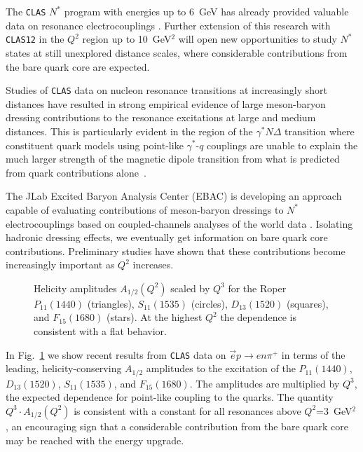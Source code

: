 The {\tt CLAS} $N^*$ program with energies up to 6~GeV has already 
provided valuable data on resonance electrocouplings
\cite{Bur1,Bu05}.  Further extension of this research with 
{\tt CLAS12} in the $Q^2$ region up to 10~GeV$^2$ will open new 
opportunities to study $N^*$ states at still unexplored distance scales, 
where considerable contributions from the bare quark core are expected.

Studies of {\tt CLAS} data on nucleon resonance transitions at increasingly 
short distances have resulted in strong empirical evidence of large 
meson-baryon dressing contributions to the resonance excitations at large 
and medium distances. This is particularly evident in the region of the 
$\gamma^*N\Delta$ transition where constituent quark models using point-like 
$\gamma^*$-$q$ couplings are unable to explain the much larger strength of 
the magnetic dipole transition from what is predicted from quark 
contributions alone~\cite{Bur1}.

The JLab Excited Baryon Analysis Center (EBAC) is developing an approach
capable of evaluating contributions of meson-baryon dressings to $N^*$ 
electrocouplings based on coupled-channels analyses of the world data 
\cite{Lee06}.  Isolating hadronic dressing effects, we eventually get 
information on bare quark core contributions.  Preliminary studies have 
shown that these contributions become increasingly important as $Q^2$ 
increases.
    
\begin{figure}[ht]
\vspace{5.3cm}
\caption{\small{Helicity amplitudes $A_{1/2}(Q^2)$ scaled by $Q^3$ for the 
Roper $P_{11}(1440)$ (triangles), $S_{11}(1535)$ (circles), $D_{13}(1520)$ 
(squares), and $F_{15}(1680)$ (stars). At the highest $Q^2$ the dependence is 
consistent with a flat behavior.}}
\label{fig:asym_1}
\end{figure}

In Fig.~\ref{fig:asym_1} we show recent results from {\tt CLAS} data on 
$\vec{e} p \rightarrow en\pi^+$ in terms of the leading, helicity-conserving 
$A_{1/2}$ amplitudes to the excitation of the $P_{11}(1440)$, $D_{13}(1520)$, 
$S_{11}(1535)$, and $F_{15}(1680)$.  The amplitudes are multiplied by $Q^3$, 
the expected dependence for point-like coupling to the quarks.  The quantity 
$Q^3 \cdot A_{1/2}(Q^2)$ is consistent with a constant for all resonances 
above $Q^2$=3~GeV$^2$, an encouraging sign that a considerable contribution 
from the bare quark core may be reached with the energy upgrade.

